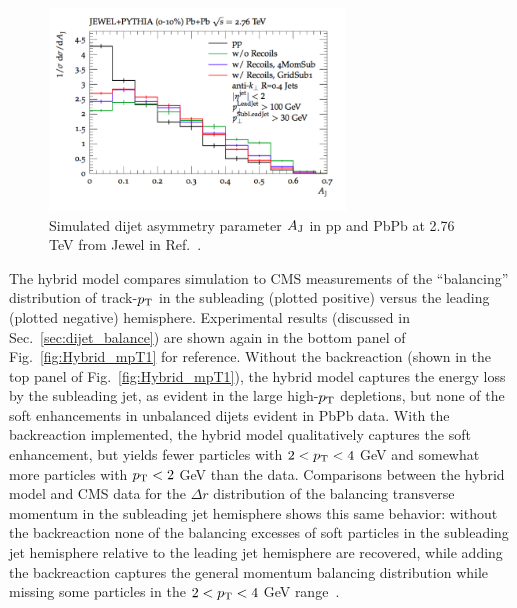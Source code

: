  \begin{figure}[hbtp]
\begin{center}
\includegraphics[width=0.7\textwidth]{figures/Models/JEWEL_Aj.png}
\caption[Simulated dijet asymmetry parameter $A_{\rm J}$ in pp and PbPb at 2.76 TeV from {\sc Jewel}]{Simulated dijet asymmetry parameter $A_{\rm J}$ in pp and PbPb at 2.76 TeV from {\sc Jewel} in Ref.~\cite{Elayavalli:2017hxo}.}
\label{fig:jewel_aj}
\end{center}
\end{figure}

The hybrid model compares simulation to CMS measurements of the ``balancing'' distribution of track-$p_{\rm T}$ in the subleading (plotted positive) versus the leading (plotted negative) hemisphere.  Experimental results (discussed in Sec.~\ref{sec:dijet_balance}) are shown again in the bottom panel of Fig.~\ref{fig:Hybrid_mpT1} for reference.  Without the backreaction (shown in the top panel of Fig.~\ref{fig:Hybrid_mpT1}), the hybrid model captures the energy loss by the subleading jet, as evident in the large high-$p_{\rm T}$ depletions, but none of the soft enhancements in unbalanced dijets evident in PbPb data.  With the backreaction implemented, the hybrid model qualitatively captures the soft enhancement, but yields fewer particles with $2 < p_{\rm T} < 4$ GeV and somewhat more particles with $p_{\rm T} < 2$ GeV than the data.  Comparisons between the hybrid model and CMS data for the $\Delta r$ distribution of the balancing transverse momentum in the subleading jet hemisphere shows this same behavior:  without the backreaction none of the balancing excesses of soft particles in the subleading jet hemisphere relative to the leading jet hemisphere are recovered, while adding the backreaction captures the general momentum balancing distribution while missing some particles in the $2 < p_{\rm T} < 4$ GeV range~\cite{Casalderrey-Solana:2016jvj}.  

